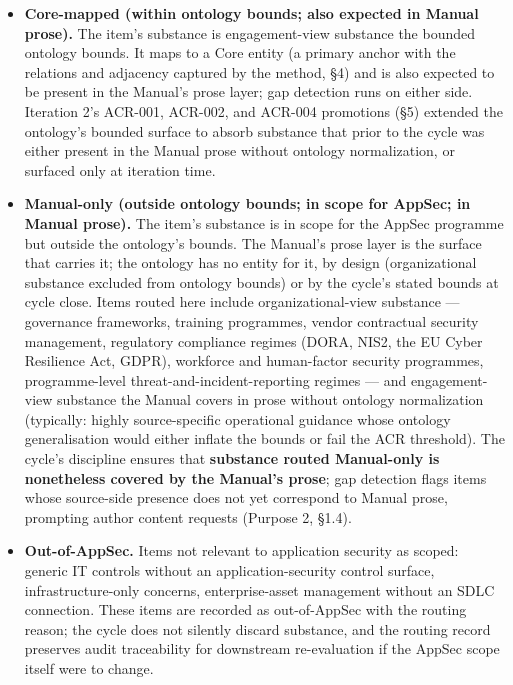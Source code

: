 \documentclass[
]{article}
\begin{document}
\begin{itemize}
\item
  \textbf{Core-mapped (within ontology bounds; also expected in Manual
  prose).} The item's substance is engagement-view substance the bounded
  ontology bounds. It maps to a Core entity (a primary anchor with the
  relations and adjacency captured by the method, §4) and is also
  expected to be present in the Manual's prose layer; gap detection runs
  on either side. Iteration 2's ACR-001, ACR-002, and ACR-004 promotions
  (§5) extended the ontology's bounded surface to absorb substance that
  prior to the cycle was either present in the Manual prose without
  ontology normalization, or surfaced only at iteration time.
\item
  \textbf{Manual-only (outside ontology bounds; in scope for AppSec; in
  Manual prose).} The item's substance is in scope for the AppSec
  programme but outside the ontology's bounds. The Manual's prose layer
  is the surface that carries it; the ontology has no entity for it, by
  design (organizational substance excluded from ontology bounds) or by
  the cycle's stated bounds at cycle close. Items routed here include
  organizational-view substance --- governance frameworks, training
  programmes, vendor contractual security management, regulatory
  compliance regimes (DORA, NIS2, the EU Cyber Resilience Act, GDPR),
  workforce and human-factor security programmes, programme-level
  threat-and-incident-reporting regimes --- and engagement-view
  substance the Manual covers in prose without ontology normalization
  (typically: highly source-specific operational guidance whose ontology
  generalisation would either inflate the bounds or fail the ACR
  threshold). The cycle's discipline ensures that \textbf{substance
  routed Manual-only is nonetheless covered by the Manual's prose}; gap
  detection flags items whose source-side presence does not yet
  correspond to Manual prose, prompting author content requests (Purpose
  2, §1.4).
\item
  \textbf{Out-of-AppSec.} Items not relevant to application security as
  scoped: generic IT controls without an application-security control
  surface, infrastructure-only concerns, enterprise-asset management
  without an SDLC connection. These items are recorded as out-of-AppSec
  with the routing reason; the cycle does not silently discard
  substance, and the routing record preserves audit traceability for
  downstream re-evaluation if the AppSec scope itself were to change.
\end{itemize}
\end{document}
